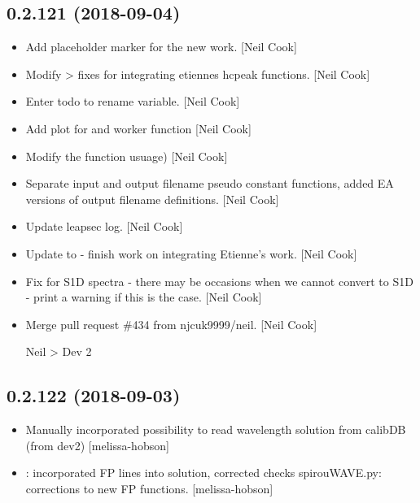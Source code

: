 \documentclass[a4paper,10pt,english]{report}
\begin{document}
\subsection{0.2.121 (2018-09-04)}
\label{\detokenize{misc/changelog:id340}}\begin{itemize}
\item {} 
Add placeholder marker for the new  work. {[}Neil
Cook{]}

\item {} 
Modify  \textendash{}\textgreater{} fixes for integrating etiennes
hcpeak functions. {[}Neil Cook{]}

\item {} 
Enter todo to rename variable. {[}Neil Cook{]}

\item {} 
Add plot for   and
worker function  {[}Neil Cook{]}

\item {} 
Modify the  function  usuage) {[}Neil Cook{]}

\item {} 
Separate input and output filename pseudo constant functions, added EA
versions of  output filename definitions. {[}Neil Cook{]}

\item {} 
Update leapsec log. {[}Neil Cook{]}

\item {} 
Update to  - finish work on integrating Etienne’s
work. {[}Neil Cook{]}

\item {} 
Fix for S1D spectra - there may be occasions when we cannot convert to
S1D - print a warning if this is the case. {[}Neil Cook{]}

\item {} 
Merge pull request \#434 from njcuk9999/neil. {[}Neil Cook{]}

Neil \textendash{}\textgreater{} Dev 2

\end{itemize}


\subsection{0.2.122 (2018-09-03)}
\label{\detokenize{misc/changelog:id341}}\begin{itemize}
\item {} 
Manually incorporated possibility to read wavelength solution from
calibDB (from dev2) {[}melissa-hobson{]}

\item {} 
: incorporated FP lines into solution,
corrected checks spirouWAVE.py: corrections to new FP functions.
{[}melissa-hobson{]}

\end{itemize}
\end{document}
